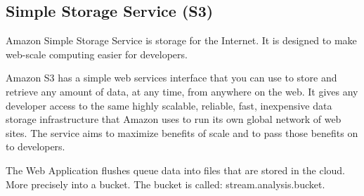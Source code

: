 \newpage

\subsection{Simple Storage Service (S3)}
\label{chap:04:03:05}

Amazon Simple Storage Service is storage for the Internet. It is designed to make web-scale computing easier for developers.\cite{s3}

Amazon S3 has a simple web services interface that you can use to store and retrieve any amount of data, at any time, from anywhere on the web. It gives any developer access to the same highly scalable, reliable, fast, inexpensive data storage infrastructure that Amazon uses to run its own global network of web sites. The service aims to maximize benefits of scale and to pass those benefits on to developers.\cite{s3}

The Web Application flushes queue data into files that are stored in the cloud. More precisely into a bucket. The bucket is called: stream.analysis.bucket.

